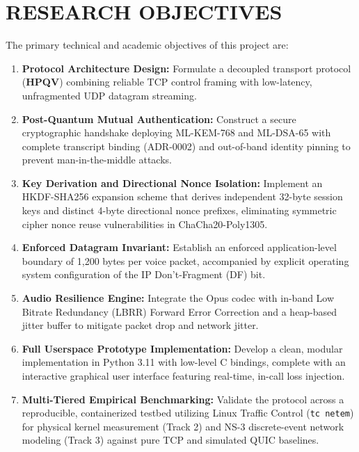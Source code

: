 \section{RESEARCH OBJECTIVES}
The primary technical and academic objectives of this project are:
\begin{enumerate}
    \item \textbf{Protocol Architecture Design:} Formulate a decoupled transport protocol (\textbf{HPQV}) combining reliable TCP control framing with low-latency, unfragmented UDP datagram streaming.
    \item \textbf{Post-Quantum Mutual Authentication:} Construct a secure cryptographic handshake deploying ML-KEM-768 and ML-DSA-65 with complete transcript binding (ADR-0002) and out-of-band identity pinning to prevent man-in-the-middle attacks.
    \item \textbf{Key Derivation and Directional Nonce Isolation:} Implement an HKDF-SHA256 expansion scheme that derives independent 32-byte session keys and distinct 4-byte directional nonce prefixes, eliminating symmetric cipher nonce reuse vulnerabilities in ChaCha20-Poly1305.
    \item \textbf{Enforced Datagram Invariant:} Establish an enforced application-level boundary of 1,200 bytes per voice packet, accompanied by explicit operating system configuration of the IP Don't-Fragment (DF) bit.
    \item \textbf{Audio Resilience Engine:} Integrate the Opus codec with in-band Low Bitrate Redundancy (LBRR) Forward Error Correction and a heap-based jitter buffer to mitigate packet drop and network jitter.
    \item \textbf{Full Userspace Prototype Implementation:} Develop a clean, modular implementation in Python 3.11 with low-level C bindings, complete with an interactive graphical user interface featuring real-time, in-call loss injection.
    \item \textbf{Multi-Tiered Empirical Benchmarking:} Validate the protocol across a reproducible, containerized testbed utilizing Linux Traffic Control (\texttt{tc netem}) for physical kernel measurement (Track 2) and NS-3 discrete-event network modeling (Track 3) against pure TCP and simulated QUIC baselines.
\end{enumerate}

